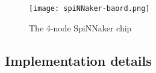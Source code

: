 \documentclass[journal,article,submit,moreauthors,pdftex,10pt,a4paper]{Definitions/mdpi}
\begin{document}

\begin{figure}[H]
    \centering
    \texttt{[image: spiNNaker-baord.png]}
    \caption{The 4-node SpiNNaker chip
}
    \label{FIG:spiNNaker-baord.png}
\end{figure}
\subsection{Implementation details}
\end{document}

